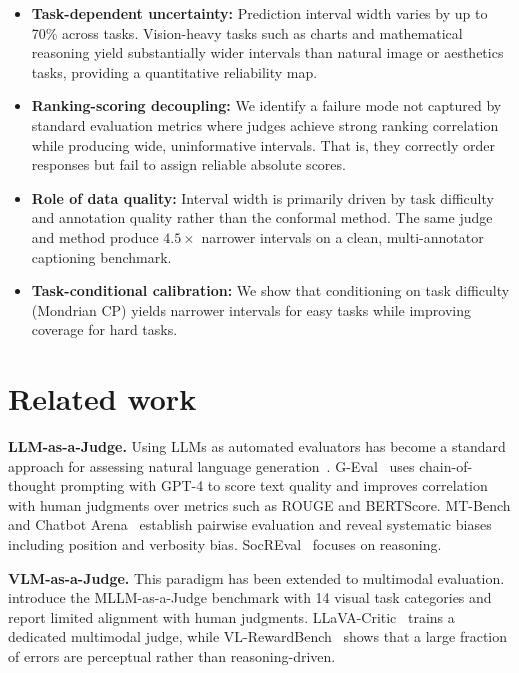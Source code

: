 \documentclass{article}
\begin{document}
\begin{itemize}[leftmargin=*,itemsep=0pt,topsep=0pt]

\item \textbf{Task-dependent uncertainty:} Prediction interval width varies by up to 70\% across tasks. Vision-heavy tasks such as charts and mathematical reasoning yield substantially wider intervals than natural image or aesthetics tasks, providing a quantitative reliability map.

\item \textbf{Ranking-scoring decoupling:} We identify a failure mode not captured by standard evaluation metrics where judges achieve strong ranking correlation while producing wide, uninformative intervals. That is, they correctly order responses but fail to assign reliable absolute scores.

\item \textbf{Role of data quality:} Interval width is primarily driven by task difficulty and annotation quality rather than the conformal method. The same judge and method produce $4.5\times$ narrower intervals on a clean, multi-annotator captioning benchmark.

\item \textbf{Task-conditional calibration:} We show that conditioning on task difficulty (Mondrian CP) yields narrower intervals for easy tasks while improving coverage for hard tasks. \vspace{-3pt}

\end{itemize}

\section{Related work}
\label{sec:related}

\textbf{LLM-as-a-Judge.}
Using LLMs as automated evaluators has become a standard approach for assessing natural language generation~\citep{zheng2023judging,liu2023geval}. G-Eval~\citep{liu2023geval} uses chain-of-thought prompting with GPT-4 to score text quality and improves correlation with human judgments over metrics such as ROUGE and BERTScore. MT-Bench and Chatbot Arena~\citep{zheng2023judging} establish pairwise evaluation and reveal systematic biases including position and verbosity bias. SocREval~\citep{he2024soceval} focuses on reasoning. 

\textbf{VLM-as-a-Judge.}
This paradigm has been extended to multimodal evaluation. \citet{chen2024mllmasajudge} introduce the MLLM-as-a-Judge benchmark with 14 visual task categories and report limited alignment with human judgments. LLaVA-Critic~\citep{xiong2024llavacritic} trains a dedicated multimodal judge, while VL-RewardBench~\citep{li2024vlrewardbench} shows that a large fraction of errors are perceptual rather than reasoning-driven. 
\end{document}
